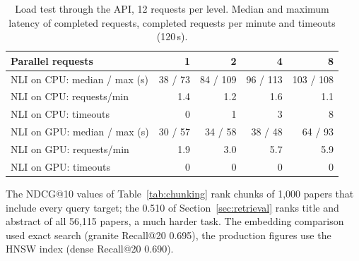 \begin{table}[ht]
\centering
\caption{Load test through the API, 12 requests per level. Median and maximum latency of completed requests, completed requests per minute and timeouts (120\,s).}
\label{tab:load}
\small
\begin{tabular}{lrrrr}
\toprule
Parallel requests & 1 & 2 & 4 & 8 \\
\midrule
NLI on CPU: median / max (s) & 38 / 73 & 84 / 109 & 96 / 113 & 103 / 108 \\
NLI on CPU: requests/min & 1.4 & 1.2 & 1.6 & 1.1 \\
NLI on CPU: timeouts & 0 & 1 & 3 & 8 \\
NLI on GPU: median / max (s) & 30 / 57 & 34 / 58 & 38 / 48 & 64 / 93 \\
NLI on GPU: requests/min & 1.9 & 3.0 & 5.7 & 5.9 \\
NLI on GPU: timeouts & 0 & 0 & 0 & 0 \\
\bottomrule
\end{tabular}
\end{table}

The NDCG@10 values of Table~\ref{tab:chunking} rank chunks of 1{,}000 papers that include every query target; the 0.510 of Section~\ref{sec:retrieval} ranks title and abstract of all 56{,}115 papers, a much harder task.
The embedding comparison used exact search (granite Recall@20 0.695), the production figures use the HNSW index (dense Recall@20 0.690).

